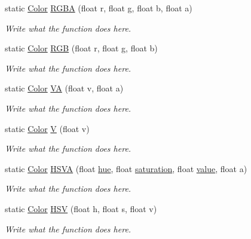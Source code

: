 \begin{DoxyCompactItemize}
\item 
static \hyperlink{structColor}{Color} \hyperlink{structColor_a9774ccbe106c1241a5a3d9e3e59ed708}{R\+G\+B\+A} (float r, float g, float b, float a)
\begin{DoxyCompactList}\small\item\em Write what the function does here. \end{DoxyCompactList}\item 
static \hyperlink{structColor}{Color} \hyperlink{structColor_a9ab1ad247c807c6fa4e57058d987e21a}{R\+G\+B} (float r, float g, float b)
\begin{DoxyCompactList}\small\item\em Write what the function does here. \end{DoxyCompactList}\item 
static \hyperlink{structColor}{Color} \hyperlink{structColor_a506e966884a553d97b115ac903c47585}{V\+A} (float v, float a)
\begin{DoxyCompactList}\small\item\em Write what the function does here. \end{DoxyCompactList}\item 
static \hyperlink{structColor}{Color} \hyperlink{structColor_a723061c1cca0072a8ecb591c4c3b4479}{V} (float v)
\begin{DoxyCompactList}\small\item\em Write what the function does here. \end{DoxyCompactList}\item 
static \hyperlink{structColor}{Color} \hyperlink{structColor_a7931d9da064abf310330867c09938771}{H\+S\+V\+A} (float \hyperlink{structColor_a183b93e13e713514a4bee5fdbd8a5a9b}{hue}, float \hyperlink{structColor_a225af5fdfba5d0d6d4d660a1f4c9a509}{saturation}, float \hyperlink{structColor_ac3fd444fb6ff3ef082cfa8978b9df834}{value}, float a)
\begin{DoxyCompactList}\small\item\em Write what the function does here. \end{DoxyCompactList}\item 
static \hyperlink{structColor}{Color} \hyperlink{structColor_a0e6381b16de7c6e8302d33881e0c14d6}{H\+S\+V} (float h, float s, float v)
\begin{DoxyCompactList}\small\item\em Write what the function does here. \end{DoxyCompactList}\item 

\end{DoxyCompactItemize}
